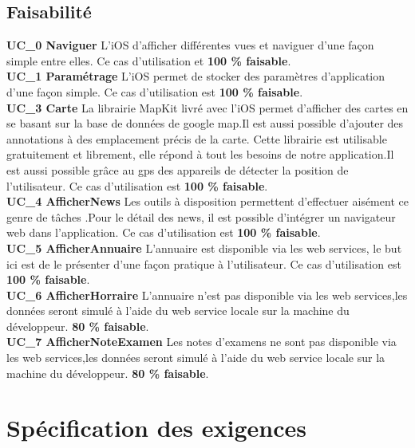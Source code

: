 	\subsection{Faisabilité}
		\textbf{UC\_0  Naviguer}  L'\gls{iOS} d'afficher différentes vues et naviguer d'une façon simple entre elles. Ce cas d'utilisation et \textbf{100 \%  faisable}.\\[0.2cm]
		\textbf{UC\_1  Paramétrage}  L'\gls{iOS} permet de stocker des paramètres d'application d'une façon simple. Ce cas d'utilisation est \textbf{100 \%  faisable}.\\[0.2cm]
		\textbf{UC\_3  Carte}  La librairie MapKit livré avec l'\gls{iOS} permet d'afficher des cartes en se basant sur la base de données de google map.Il est aussi possible d'ajouter des annotations à des emplacement précis de la carte. Cette librairie est utilisable gratuitement et librement, elle répond à tout les besoins de notre application.Il est aussi possible grâce au gps des appareils de détecter la position de l'utilisateur.  Ce cas d'utilisation est \textbf{100 \%  faisable}.\\[0.2cm]
		\textbf{UC\_4  AfficherNews}  Les outils à disposition permettent d'effectuer aisément ce genre de tâches  .Pour le détail des news, il est possible d'intégrer un navigateur web dans l'application. Ce cas d'utilisation est \textbf{100 \%  faisable}.\\[0.2cm]
		\textbf{UC\_5 AfficherAnnuaire}  L'annuaire est disponible via les web services, le but ici est de le présenter d'une façon pratique à l'utilisateur. Ce cas d'utilisation est \textbf{100 \%  faisable}.\\[0.2cm]
		\textbf{UC\_6 AfficherHorraire}  L'annuaire n'est pas disponible via les web services,les données seront simulé à l'aide du web service locale sur la machine du développeur. \textbf{80 \%  faisable}.\\[0.2cm]
		\textbf{UC\_7 AfficherNoteExamen}   Les notes d'examens ne sont pas disponible via les web services,les données seront simulé à l'aide du web service locale sur la machine du développeur. \textbf{80 \%  faisable}.\\[0.2cm]
		
\section{Spécification des exigences }
